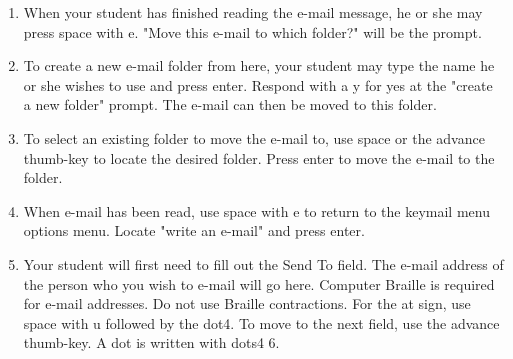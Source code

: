 \documentclass[10pt,letterpaper,twoside]{report}
\begin{document}
{{{\begin{enumerate}
\begin{itemize}
		      \item To read back by paragraph    
		      \item To read the current paragraph  
		      \item To read forward by paragraph  
		      \item Move Back or Forward one display length   or {\textcolor{accent}{\MakeUppercase{\textbf{back thumb-key}}}}
		      \item Start braille display moving automatically  
		        \begin{itemize}
		      \item Control the speed of braille display 
		      \item Stop the display from automatically moving 
		        \end{itemize}
		      \end{itemize}
	\item When your student has finished reading the e-mail message, he or she may press space with e.  "Move this e-mail to which folder?" will be the prompt.
	\item To create a new e-mail folder from here, your student may type the name he or she wishes to use and press enter.  Respond with a y for yes at the "create a new folder" prompt.  The e-mail can then be moved to this folder.
	\item To select an existing folder to move the e-mail to, use space or the advance thumb-key to locate the desired folder.  Press enter to move the e-mail to the folder.
	\item When e-mail has been read, use space with e to return to the keymail menu options menu.  Locate "write an e-mail" and press enter.
	\item Your student will first need to fill out the Send To field.  The e-mail address of the person who you wish to e-mail will go here.  Computer Braille is required for e-mail addresses.  Do not use Braille contractions.  For the at sign, use space with u followed by the dot4. To move to the next field, use the advance thumb-key. A dot is written with dots4 6.

\end{enumerate}}}}
\end{document}
